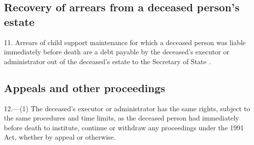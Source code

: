\documentclass[12pt,a4paper]{article}
\begin{document}
\subsection[11. Recovery of arrears from a deceased person’s estate]{Recovery of arrears from a deceased person’s estate}

11.  Arrears of child support maintenance for which a deceased person was liable immediately before death are a debt payable by the deceased’s executor or administrator out of the deceased’s estate to the 
Secretary of State%
.


\subsection[12. Appeals and other proceedings]{Appeals and other proceedings}

12.---(1)  The deceased’s executor or administrator has the same rights, subject to the same procedures and time limits, as the deceased person had immediately before death to institute, continue or withdraw any proceedings under the 1991 Act, whether by appeal or otherwise.


\end{document}
